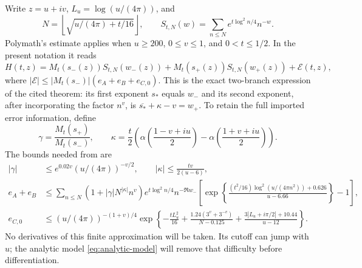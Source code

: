\documentclass[11pt]{article}
\numberwithin{equation}{section}
\theoremstyle{definition}
\theoremstyle{remark}
\begin{document}
Write $z=u+iv$, $L_u=\log(u/(4\pi))$, and
\[
 N=\left\lfloor\sqrt{u/(4\pi)+t/16}\right\rfloor,
 \qquad S_{t,N}(w)=\sum_{n\le N}e^{t\log^2n/4}n^{-w}.
\]
Polymath's estimate applies when $u\ge200$, $0\le v\le1$, and
$0<t\le1/2$. In the present notation it reads
\begin{equation}
 H(t,z)=M_t(s_-(z))S_{t,N}(w_-(z))
       +M_t(s_+(z))S_{t,N}(w_+(z))+\mathcal E(t,z),
 \label{eq:RS-input}
\end{equation}
where $|\mathcal E|\le |M_t(s_-)|(e_A+e_B+e_{C,0})$.
This is the exact two-branch expression of the cited theorem: its first
exponent $s_*$ equals $w_-$ and its second exponent, after incorporating
the factor $n^v$, is $\overline{s_*}+\kappa-v=w_+$. To retain the full
imported error information, define
\[
 \gamma=\frac{M_t(s_+)}{M_t(s_-)},\qquad
 \kappa=\frac t2\left(\alpha\left(\frac{1-v+iu}{2}\right)
                -\alpha\left(\frac{1+v+iu}{2}\right)\right).
\]
The bounds needed from \cite[eqs. (20)--(24)]{polymath} are
\begin{align}
 |\gamma|&\le e^{0.02v}(u/(4\pi))^{-v/2},\qquad
 |\kappa|\le\frac{tv}{2(u-6)},\label{eq:RS-ratios}\\
 e_A+e_B&\le\sum_{n\le N}(1+|\gamma|N^{|\kappa|}n^v)
 e^{t\log^2n/4}n^{-\Re w_-}
 \left[\exp\left\{\frac{(t^2/16)\log^2(u/(4\pi n^2))+0.626}
                             {u-6.66}\right\}-1\right],
 \label{eq:RS-AB}\\
 e_{C,0}&\le (u/(4\pi))^{-(1+v)/4}
 \exp\left\{-\frac{tL_u^2}{16}
 +\frac{1.24(3^v+3^{-v})}{N-0.125}
 +\frac{3|L_u+i\pi/2|+10.44}{u-12}\right\}.
 \label{eq:RS-C}
\end{align}
No derivatives of this finite approximation will be taken. Its cutoff
can jump with $u$; the analytic model \eqref{eq:analytic-model} will
remove that difficulty before differentiation.
\end{document}
